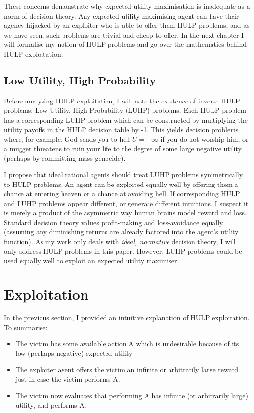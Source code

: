 \documentclass{article}
\begin{document}
These concerns demonstrate why expected utility maximisation is inadequate as a norm of decision theory. Any expected utility maximising agent can have their agency hijacked by an exploiter who is able to offer them HULP problems, and as we have seen, such problems are trivial and cheap to offer. In the next chapter I will formalise my notion of HULP problems and go over the mathematics behind HULP exploitation.

\subsection{Low Utility, High Probability}

Before analysing HULP exploitation, I will note the existence of inverse-HULP problems: Low Utility, High Probability (LUHP) problems. Each HULP problem has a corresponding LUHP problem which can be constructed by multiplying the utility payoffs in the HULP decision table by -1. This yields decision problems where, for example, God sends you to hell \(U=-\infty\) if you do not worship him, or a mugger threatens to ruin your life to the degree of some large negative utility (perhaps by committing mass genocide). 

I propose that ideal rational agents should treat LUHP problems symmetrically to HULP problems. An agent can be exploited equally well by offering them a chance at entering heaven or a chance at avoiding hell. If corresponding HULP and LUHP problems appear different, or generate different intuitions, I suspect it is merely a product of the asymmetric way human brains model reward and loss. Standard decision theory values profit-making and loss-avoidance equally (assuming any diminishing returns are already factored into the agent's utility function). As my work only deals with \textit{ideal, normative} decision theory, I will only address HULP problems in this paper. However, LUHP problems could be used equally well to exploit an expected utility maximiser.

\newpage\section{Exploitation}

In the previous section, I provided an intuitive explanation of HULP exploitation. To summarise:

\begin{itemize}
\item The victim has some available action A which is undesirable because of its low (perhaps negative) expected utility
\item The exploiter agent offers the victim an infinite or arbitrarily large reward just in case the victim performs A. 
\item The victim now evaluates that performing A has infinite (or arbitrarily large) utility, and performs A.
\end{itemize}
\end{document}
